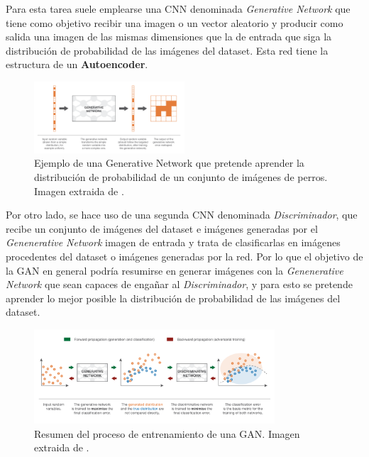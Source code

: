             \medskip

            \noindent Para esta tarea suele emplearse una CNN denominada \textit{Generative Network} que tiene como objetivo recibir una imagen o un vector aleatorio y producir como salida una imagen de las mismas dimensiones que la de entrada que siga la distribución de probabilidad de las imágenes del dataset. Esta red tiene la estructura de un \textbf{Autoencoder}.

            \begin{figure}[!h]
                \centering
                \includegraphics[width=0.5\textwidth]{img/Generative_network.png}
                \caption{Ejemplo de una Generative Network que pretende aprender la distribución de probabilidad de un conjunto de imágenes de perros. Imagen extraida de \cite{autoencoders2017}.}
                \label{fig:Generative Network}
            \end{figure}
            
            \medskip

            \noindent Por otro lado, se hace uso de una segunda CNN denominada \textit{Discriminador}, que recibe un conjunto de imágenes del dataset e imágenes generadas por el \textit{Genenerative Network} imagen de entrada y trata de clasificarlas en imágenes procedentes del dataset o imágenes generadas por la red. Por lo que el objetivo de la GAN en general podría resumirse en generar imágenes con la \textit{Genenerative Network} que sean capaces de engañar al \textit{Discriminador}, y para esto se pretende aprender lo mejor posible la distribución de probabilidad de las imágenes del dataset.

            \begin{figure}[!h]
                \centering
                \includegraphics[width=0.8\textwidth]{img/proceso_entrenamiento_GAN.png}
                \caption{Resumen del proceso de entrenamiento de una GAN. Imagen extraida de \cite{autoencoders2017}.}
                \label{fig:Generative Network}
            \end{figure}

